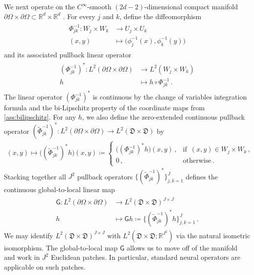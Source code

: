 \documentclass[pdflatex,sn-mathphys-num]{sn-jnl-preprint}
\newcommand{\R}{\mathbb{R}}
\newcommand{\sfG}{\mathsf{G}}
\newcommand{\pOmega}{{\partial\Omega}}
\newcommand{\defeq}{\coloneqq} %
\theoremstyle{thmstyleone}%
\theoremstyle{thmstyletwo}%
\theoremstyle{thmstylethree}%
\numberwithin{equation}{section}
\numberwithin{theorem}{section}
\begin{document}
We next operate on the $C^\infty$-smooth $(2d-2)$-dimensional compact manifold $\pOmega\times\pOmega\subset\R^d\times\R^d $ \cite[Prop.~5.18, p.~56]{tu2011manifold}.
For every $j$ and $k$, define the diffeomorphism
\begin{align}\label{eqn:coord_backward}
    \begin{split}
        \Phi_{jk}^{-1}\colon W_j\times W_k&\to U_j\times U_k\\
        (x,y)&\mapsto \bigl(\phi_j^{-1}(x),\phi_k^{-1}(y)\bigr)
    \end{split}
\end{align}
and its associated pullback linear operator
\begin{align}\label{eqn:coord_backward_pull}
\begin{split}
    (\Phi_{jk}^{-1})^*\colon L^2(\pOmega\times\pOmega) &\to L^2(W_j\times W_k)\\
    h&\mapsto h\circ \Phi_{jk}^{-1}\,.
\end{split}
\end{align}
The linear operator $(\Phi_{jk}^{-1})^*$ is continuous by the change of variables integration formula and the bi-Lipschitz property of the coordinate maps from \cref{ass:bilipschitz}. For any $h$, we also define the zero-extended continuous pullback operator $(\widetilde{\Phi}_{jk}^{-1})^*\colon L^2(\pOmega\times\pOmega) \to L^2(\mathfrak{D}\times \mathfrak{D})$ by
\begin{align}\label{eqn:pull_inv_zero}
    (x,y)\mapsto \bigl((\widetilde{\Phi}_{jk}^{-1})^* h\bigr)(x,y)\defeq
    \begin{cases}
        \bigl(({\Phi}_{jk}^{-1})^* h\bigr)(x,y)\, , & \text{if }\, (x,y)\in W_j\times W_k\,,\\
        0\, , & \text{otherwise}\,.
    \end{cases}
\end{align}
Stacking together all $J^2$ pullback operators $\{(\widetilde{\Phi}_{jk}^{-1})^*\}_{j,k=1}^J$ defines the continuous global-to-local linear map
\begin{align}\label{eqn:global_to_local}
    \begin{split}
        {\sfG}\colon L^2(\pOmega\times\pOmega)&\to L^2(\mathfrak{D}\times \mathfrak{D})^{J\times J}\\
        h&\mapsto {\sfG} h\defeq \bigl\{(\widetilde{\Phi}_{jk}^{-1})^* h\bigr\}_{j,k=1}^J\,.
    \end{split}
\end{align}
We may identify $L^2(\mathfrak{D}\times \mathfrak{D})^{J\times J}$ with $L^2(\mathfrak{D}\times \mathfrak{D};\R^{J^2})$ via the natural isometric isomorphism.
The global-to-local map $\sfG$ allows us to move off of the manifold and work in $J^2$ Euclidean patches. In particular, standard neural operators are applicable on such patches.
\end{document}
